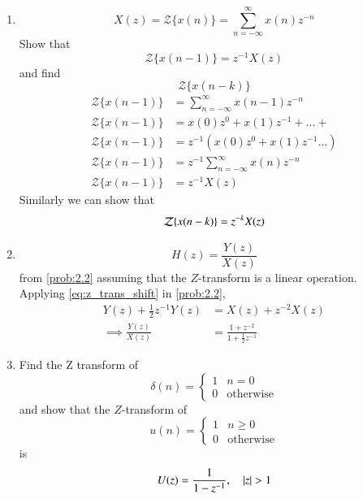 \documentclass[journal,12pt,twocolumn]{IEEEtran}
\theoremstyle{remark}
\begin{document}
\begin{enumerate}[label=\thesection.\arabic*
,ref=\thesection.\theenumi]
\begin{enumerate}[label=\thesection.\arabic*
,ref=\thesection.\theenumi]
\section{Z-Transform}
\item 
\begin{equation}
X(z)={\mathcal {Z}}\{x(n)\}=\sum _{n=-\infty }^{\infty }x(n)z^{-n}
\end{equation}
Show that
\begin{equation}
\label{eq:shift1}
{\mathcal {Z}}\{x(n-1)\} = z^{-1}X(z)
\end{equation}
and find
\begin{equation}
	{\mathcal {Z}}\{x(n-k)\} 
\end{equation}
\solution 
\begin{align}
    {\mathcal {Z}}\{x(n-1)\}&=\sum _{n=-\infty }^{\infty }x(n-1)z^{-n}\\
    {\mathcal {Z}}\{x(n-1)\}&=x(0)z^{0}+x(1)z^{-1}+...+\\
    {\mathcal {Z}}\{x(n-1)\}&=z^{-1}(x(0)z^{0}+x(1)z^{-1}...)\\
    {\mathcal {Z}}\{x(n-1)\}&=z^{-1}\sum _{n=-\infty }^{\infty }x(n)z^{-n}\\
    {\mathcal {Z}}\{x(n-1)\}&=z^{-1}X(z)
\end{align}
Similarly we can show that 
\begin{equation}
\label{eq:z_trans_shift}
	{\mathcal {Z}}\{x(n-k)\} = z^{-k}X(z)\\
\end{equation}
\item \begin{equation}
H(z) = \frac{Y(z)}{X(z)}
\end{equation}
from \eqref{prob:2.2} assuming that the $Z$-transform is a linear operation.
\\
\solution  Applying \eqref{eq:z_trans_shift} in \eqref{prob:2.2},
\begin{align}
Y(z) + \frac{1}{2}z^{-1}Y(z) &= X(z)+z^{-2}X(z)
\\
\implies \frac{Y(z)}{X(z)} &= \frac{1 + z^{-2}}{1 + \frac{1}{2}z^{-1}}
\label{eq:freq_resp}
\end{align}


\item Find the Z transform of 
\begin{equation}
\delta(n)
=
\begin{cases}
1 & n = 0
\\
0 & \text{otherwise}
\end{cases}
\end{equation}
and show that the $Z$-transform of
\begin{equation}
\label{eq:unit_step}
u(n)
=
\begin{cases}
1 & n \ge 0
\\
0 & \text{otherwise}
\end{cases}
\end{equation}
is
\begin{equation}
U(z) = \frac{1}{1-z^{-1}}, \quad \left\vert z\right\vert > 1
\end{equation}



\end{enumerate}
\end{enumerate}
\end{document}
